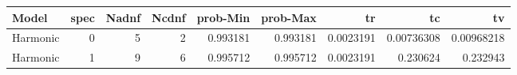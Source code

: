 \begin{tabular}{lrrrrrrrr}
\hline
 Model    &   spec &   Nadnf &   Ncdnf &   prob-Min &   prob-Max &        tr &         tc &         tv \\
\hline
 Harmonic &      0 &       5 &       2 &   0.993181 &   0.993181 & 0.0023191 & 0.00736308 & 0.00968218 \\
 Harmonic &      1 &       9 &       6 &   0.995712 &   0.995712 & 0.0023191 & 0.230624   & 0.232943   \\
\hline
\end{tabular}
